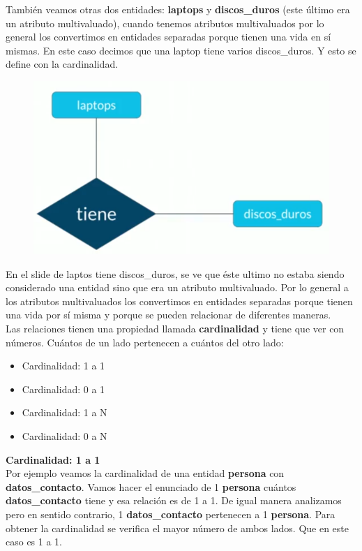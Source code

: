 \documentclass{article}
\begin{document}
También veamos otras dos entidades: \textbf{laptops} y \textbf{discos\_duros}
(este último era un atributo multivaluado), cuando tenemos atributos
multivaluados por lo general los convertimos en entidades separadas porque
tienen una vida en sí mismas. En este caso decimos que una laptop tiene varios
discos\_duros. Y esto se define con la cardinalidad.

\begin{figure}[h!]
    \centering
      \includegraphics[scale=0.45]{./Pictures/012_relacion_tiene.png}
\end{figure}

En el slide de laptos tiene discos\_duros, se ve que éste ultimo no estaba
siendo considerado una entidad sino que era un atributo multivaluado. Por lo
general a los atributos multivaluados los convertimos en entidades separadas
porque tienen una vida por sí misma y porque se pueden relacionar de diferentes
maneras.\\

Las relaciones tienen una propiedad llamada \textbf{cardinalidad} y tiene que
ver con números. Cuántos de un lado pertenecen a cuántos del otro lado:\\

\begin{itemize}
  \item Cardinalidad: 1 a 1
  \item Cardinalidad: 0 a 1
  \item Cardinalidad: 1 a N
  \item Cardinalidad: 0 a N
\end{itemize}

\textbf{Cardinalidad: 1 a 1}\\
Por ejemplo veamos la cardinalidad de una entidad \textbf{persona} con
\textbf{datos\_contacto}. Vamos hacer el enunciado de 1 \textbf{persona}
cuántos \textbf{datos\_contacto} tiene y esa relación es de 1 a 1. De igual
manera analizamos pero en sentido contrario, 1 \textbf{datos\_contacto}
pertenecen a 1 \textbf{persona}. Para obtener la cardinalidad se verifica el
mayor número de ambos lados. Que en este caso es 1 a 1.
\end{document}
